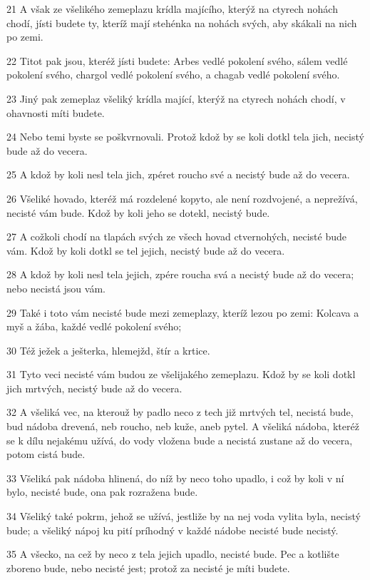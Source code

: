 \par 21 A však ze všelikého zemeplazu krídla majícího, kterýž na ctyrech nohách chodí, jísti budete ty, kteríž mají stehénka na nohách svých, aby skákali na nich po zemi.
\par 22 Titot pak jsou, kteréž jísti budete: Arbes vedlé pokolení svého, sálem vedlé pokolení svého, chargol vedlé pokolení svého, a chagab vedlé pokolení svého.
\par 23 Jiný pak zemeplaz všeliký krídla mající, kterýž na ctyrech nohách chodí, v ohavnosti míti budete.
\par 24 Nebo temi byste se poškvrnovali. Protož kdož by se koli dotkl tela jich, necistý bude až do vecera.
\par 25 A kdož by koli nesl tela jich, zpéret roucho své a necistý bude až do vecera.
\par 26 Všeliké hovado, kteréž má rozdelené kopyto, ale není rozdvojené, a neprežívá, necisté vám bude. Kdož by koli jeho se dotekl, necistý bude.
\par 27 A cožkoli chodí na tlapách svých ze všech hovad ctvernohých, necisté bude vám. Kdož by koli dotkl se tel jejich, necistý bude až do vecera.
\par 28 A kdož by koli nesl tela jejich, zpére roucha svá a necistý bude až do vecera; nebo necistá jsou vám.
\par 29 Také i toto vám necisté bude mezi zemeplazy, kteríž lezou po zemi: Kolcava a myš a žába, každé vedlé pokolení svého;
\par 30 Též ježek a ješterka, hlemejžd, štír a krtice.
\par 31 Tyto veci necisté vám budou ze všelijakého zemeplazu. Kdož by se koli dotkl jich mrtvých, necistý bude až do vecera.
\par 32 A všeliká vec, na kterouž by padlo neco z tech již mrtvých tel, necistá bude, bud nádoba drevená, neb roucho, neb kuže, aneb pytel. A všeliká nádoba, kteréž se k dílu nejakému užívá, do vody vložena bude a necistá zustane až do vecera, potom cistá bude.
\par 33 Všeliká pak nádoba hlinená, do níž by neco toho upadlo, i což by koli v ní bylo, necisté bude, ona pak rozražena bude.
\par 34 Všeliký také pokrm, jehož se užívá, jestliže by na nej voda vylita byla, necistý bude; a všeliký nápoj ku pití príhodný v každé nádobe necisté bude necistý.
\par 35 A všecko, na cež by neco z tela jejich upadlo, necisté bude. Pec a kotlište zboreno bude, nebo necisté jest; protož za necisté je míti budete.
